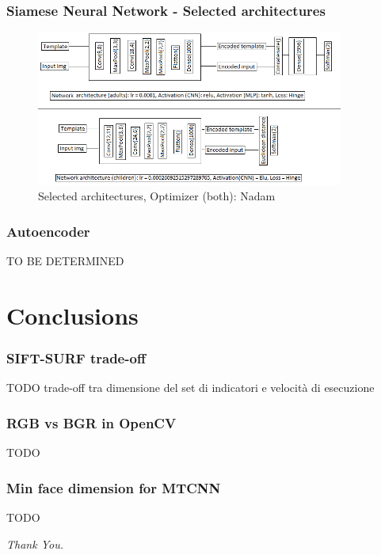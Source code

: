 \documentclass{beamer}
\begin{document}
	\begin{frame}
		\frametitle {Siamese Neural Network - Selected architectures}
		\begin{figure}
			\centering
			\includegraphics[width=0.9\textwidth, height=0.65\textheight]{img/schema_modelli_unico.png}
    		\caption{Selected architectures, Optimizer (both): Nadam}
    		\label{fig:selected_architectures}
		\end{figure}
	\end{frame}
	
	\begin{frame}
		\frametitle{Autoencoder}
		TO BE DETERMINED
	\end{frame}
	
	\section{Conclusions}
	\begin{frame}
		\frametitle{SIFT-SURF trade-off}
		TODO trade-off tra dimensione del set di indicatori e velocità di esecuzione
	\end{frame}
	
	\begin{frame}
		\frametitle{RGB vs BGR in OpenCV}
		TODO
	\end{frame}
	
	\begin{frame}
		\frametitle{Min face dimension for MTCNN}
		TODO
	\end{frame}
	
	\begin{frame}
		\centering \Huge
		\emph{Thank You.}
	\end{frame}
\end{document}
